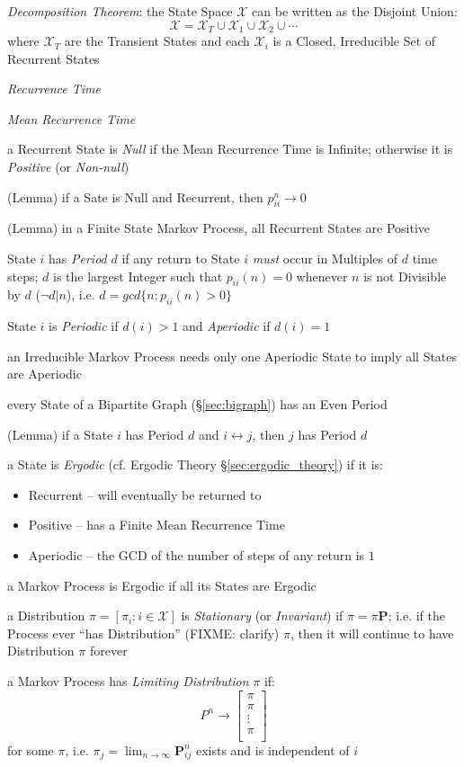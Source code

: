 \emph{Decomposition Theorem}:
the State Space $\mathcal{X}$ can be written as the Disjoint Union:
\[
  \mathcal{X} = \mathcal{X}_T \cup \mathcal{X}_1 \cup \mathcal{X}_2 \cup \cdots
\]
where $\mathcal{X}_T$ are the Transient States and each $\mathcal{X}_i$ is a
Closed, Irreducible Set of Recurrent States

\emph{Recurrence Time}

\emph{Mean Recurrence Time}

a Recurrent State is \emph{Null} if the Mean Recurrence Time is Infinite;
otherwise it is \emph{Positive} (or \emph{Non-null})

(Lemma) if a Sate is Null and Recurrent, then $p_{ii}^n \to 0$

(Lemma) in a Finite State Markov Process, all Recurrent States are Positive

State $i$ has \emph{Period} $d$ if any return to State $i$ \emph{must} occur in
Multiples of $d$ time steps; $d$ is the largest Integer such that
$p_{ii}(n) = 0$ whenever $n$ is not Divisible by $d$ ($\neg d | n$), i.e.
$d = gcd\{n : p_{ii}(n) > 0 \}$

State $i$ is \emph{Periodic} if $d(i) > 1$ and \emph{Aperiodic} if $d(i) = 1$

an Irreducible Markov Process needs only one Aperiodic State to imply all States
are Aperiodic

every State of a Bipartite Graph (\S\ref{sec:bigraph}) has an Even Period

(Lemma) if a State $i$ has Period $d$ and $i \leftrightarrow j$, then $j$ has
Period $d$

a State is \emph{Ergodic} (cf. Ergodic Theory \S\ref{sec:ergodic_theory}) if it
is:
\begin{itemize}
  \item Recurrent -- will eventually be returned to
  \item Positive -- has a Finite Mean Recurrence Time
  \item Aperiodic -- the GCD of the number of steps of any return is $1$
\end{itemize}
a Markov Process is Ergodic if all its States are Ergodic

a Distribution $\pi = [\pi_i : i \in \mathcal{X}]$ is \emph{Stationary} (or
\emph{Invariant}) if $\pi = \pi \mathbf{P}$; i.e. if the Process ever ``has
Distribution'' (FIXME: clarify) $\pi$, then it will continue to have
Distribution $\pi$ forever

a Markov Process has \emph{Limiting Distribution} $\pi$ if:
\[
  P^n \to \begin{bmatrix}
    \pi \\
    \pi \\
    \vdots \\
    \pi \\
  \end{bmatrix}
\]
for some $\pi$, i.e. $\pi_j = \lim_{n\to\infty} \mathbf{P}_{ij}^n$
exists and is independent of $i$

